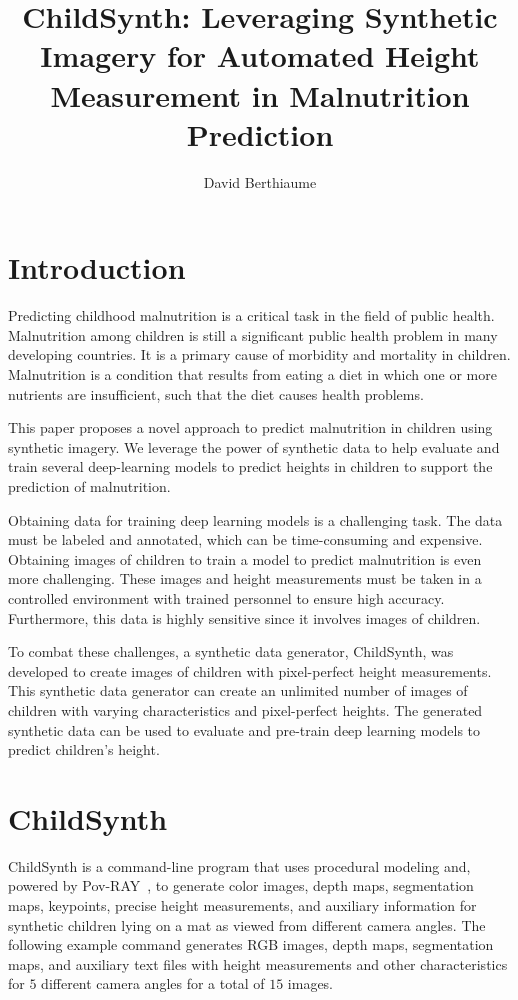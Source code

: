 \documentclass{article}
\title{ChildSynth: Leveraging Synthetic Imagery for Automated Height Measurement in Malnutrition Prediction}
\author{David Berthiaume}
\begin{document}
\maketitle


\section{Introduction}

Predicting childhood malnutrition is a critical task in the field of public health. Malnutrition among children is still a significant public health problem in many developing countries. It is a primary cause of morbidity and mortality in children. Malnutrition is a condition that results from eating a diet in which one or more nutrients are insufficient, such that the diet causes health problems.

This paper proposes a novel approach to predict malnutrition in children using synthetic imagery. 
We leverage the power of synthetic data to help evaluate and train several deep-learning models to predict heights in children to support the prediction of malnutrition. 

Obtaining data for training deep learning models is a challenging task. The data must be labeled and annotated, which can be time-consuming and expensive. Obtaining images of children to train a model to predict malnutrition is even more challenging. These images and height measurements must be taken in a controlled environment with trained personnel to ensure high accuracy. Furthermore, this data is highly sensitive since it involves images of children.

To combat these challenges, a synthetic data generator, ChildSynth, was developed to create images of children with pixel-perfect height measurements. This synthetic data generator can create an unlimited number of images of children with varying characteristics and pixel-perfect heights. The generated synthetic data can be used to evaluate and pre-train deep learning models to predict children's height. 

\section{ChildSynth}

ChildSynth is a command-line program that uses procedural modeling and, powered by Pov-RAY~\cite{povray}, to generate color images, depth maps, segmentation maps, keypoints, precise height measurements, and auxiliary information for synthetic children lying on a mat as viewed from different camera angles. The following example command generates RGB images, depth maps, segmentation maps, and auxiliary text files with height measurements and other characteristics for $5$ different camera angles for a total of $15$ images. 
\end{document}
